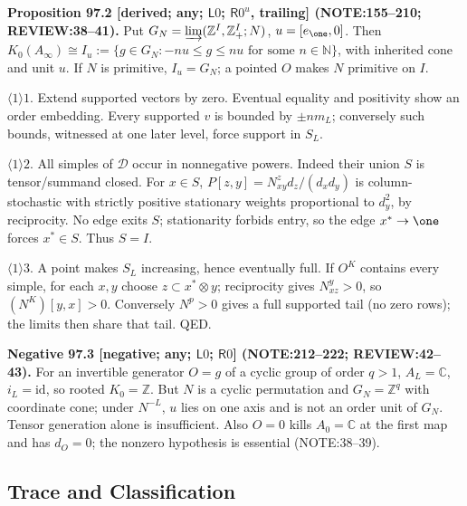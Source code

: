 \textbf{Proposition 97.2 [derived; any; \(\mathsf L0\); \(\mathsf R0^u\), trailing] (NOTE:155--210; REVIEW:38--41).}
Put \(G_N=\varinjlim(\mathbb Z^I,\mathbb Z_+^I;N)\), \(u=[e_\one,0]\). Then
\(K_0(A_\infty)\cong I_u:=\{g\in G_N:-nu\le g\le nu\text{ for some }n\in\mathbb N\}\), with inherited cone and unit \(u\).
If \(N\) is primitive, \(I_u=G_N\); a pointed \(O\) makes \(N\) primitive on \(I\).
\par\(\langle1\rangle1\). Extend supported vectors by zero. Eventual equality and positivity show an order embedding.
Every supported \(v\) is bounded by \(\pm nm_L\); conversely such bounds, witnessed at one later level, force support in \(S_L\).
\par\(\langle1\rangle2\). All simples of \(\mathcal D\) occur in nonnegative powers. Indeed their union \(S\) is
tensor/summand closed. For \(x\in S\), \(P[z,y]=N_{xy}^z d_z/(d_xd_y)\) is column-stochastic with strictly positive
stationary weights proportional to \(d_y^2\), by reciprocity. No edge exits \(S\); stationarity forbids entry, so the
edge \(x^*\to\one\) forces \(x^*\in S\). Thus \(S=I\).
\par\(\langle1\rangle3\). A point makes \(S_L\) increasing, hence eventually full. If \(O^K\) contains every simple,
for each \(x,y\) choose \(z\subset x^*\otimes y\); reciprocity gives \(N_{xz}^y>0\), so \((N^K)[y,x]>0\).
Conversely \(N^p>0\) gives a full supported tail (no zero rows); the limits then share that tail. QED.

\textbf{Negative 97.3 [negative; any; \(\mathsf L0\); \(\mathsf R0\)] (NOTE:212--222; REVIEW:42--43).}
For an invertible generator \(O=g\) of a cyclic group of order \(q>1\), \(A_L=\mathbb C\), \(i_L=\mathrm{id}\),
so rooted \(K_0=\mathbb Z\). But \(N\) is a cyclic permutation and \(G_N=\mathbb Z^q\) with coordinate cone;
under \(N^{-L}\), \(u\) lies on one axis and is not an order unit of \(G_N\). Tensor generation alone is insufficient.
Also \(O=0\) kills \(A_0=\mathbb C\) at the first map and has \(d_O=0\); the nonzero hypothesis is essential (NOTE:38--39).

\subsection{Trace and Classification}

